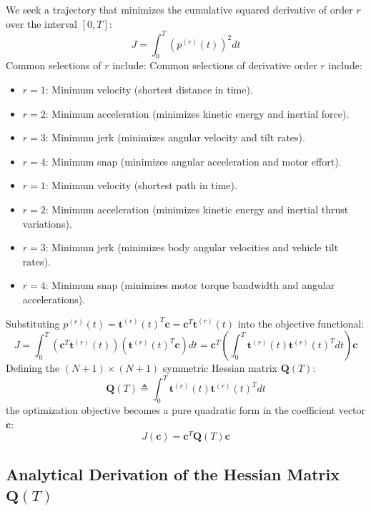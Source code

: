 \documentclass[11pt,a4paper]{article}
\begin{document}
We seek a trajectory that minimizes the cumulative squared derivative of order $r$ over the interval $[0, T]$:
\begin{equation}
J = \int_0^T \left( p^{(r)}(t) \right)^2 dt
\end{equation}
Common selections of $r$ include:
Common selections of derivative order $r$ include:
\begin{itemize}
    \item $r = 1$: Minimum velocity (shortest distance in time).
    \item $r = 2$: Minimum acceleration (minimizes kinetic energy and inertial force).
    \item $r = 3$: Minimum jerk (minimizes angular velocity and tilt rates).
    \item $r = 4$: Minimum snap (minimizes angular acceleration and motor effort).
    \item $r = 1$: Minimum velocity (shortest path in time).
    \item $r = 2$: Minimum acceleration (minimizes kinetic energy and inertial thrust variations).
    \item $r = 3$: Minimum jerk (minimizes body angular velocities and vehicle tilt rates).
    \item $r = 4$: Minimum snap (minimizes motor torque bandwidth and angular accelerations).
\end{itemize}

Substituting $p^{(r)}(t) = \mathbf{t}^{(r)}(t)^T \mathbf{c} = \mathbf{c}^T \mathbf{t}^{(r)}(t)$ into the objective functional:
\begin{equation}
J = \int_0^T \left( \mathbf{c}^T \mathbf{t}^{(r)}(t) \right) \left( \mathbf{t}^{(r)}(t)^T \mathbf{c} \right) dt
= \mathbf{c}^T \left( \int_0^T \mathbf{t}^{(r)}(t) \mathbf{t}^{(r)}(t)^T dt \right) \mathbf{c}
\end{equation}
Defining the $(N+1) \times (N+1)$ symmetric Hessian matrix $\mathbf{Q}(T)$:
\begin{equation}
\mathbf{Q}(T) \triangleq \int_0^T \mathbf{t}^{(r)}(t) \mathbf{t}^{(r)}(t)^T dt
\end{equation}
the optimization objective becomes a pure quadratic form in the coefficient vector $\mathbf{c}$:
\begin{equation}
\label{eq:quadratic_cost}
J(\mathbf{c}) = \mathbf{c}^T \mathbf{Q}(T) \mathbf{c}
\end{equation}

\subsection{Analytical Derivation of the Hessian Matrix \texorpdfstring{$\mathbf{Q}(T)$}{Q(T)}}
\end{document}
